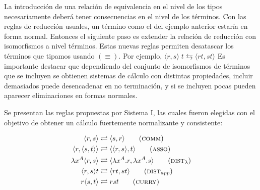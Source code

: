\documentclass[]{report}
\begin{document}
	La introducción de una relación de equivalencia en el nivel de los tipos necesariamente deberá tener consecuencias en el nivel de los términos.
	Con las reglas de reducción usuales, un término como el del ejemplo anterior estaría en forma normal.
	Entonces el siguiente paso es extender la relación de reducción con	isomorfismos a nivel términos.
	Estas nuevas reglas permiten desatascar los términos que tipamos usando $(\equiv)$.
	Por ejemplo, $\langle r, s \rangle \; t \leftrightarrows \langle r t, s t \rangle$
	Es importante destacar que dependiendo del conjunto de isomorfismos de términos que se incluyen se obtienen sistemas de cálculo con distintas propiedades, incluir demasiados puede desencadenar en no terminación, y si se incluyen pocas pueden aparecer eliminaciones en formas normales.
	
	Se presentan las reglas propuestas por Sistema I, las cuales fueron elegidas con el objetivo de obtener un cálculo fuertemente normalizante y consistente:
	
	\begin{align}
		\langle r,s \rangle &\rightleftarrows \langle s,r \rangle \tag{\textsc{comm}} \\
		\langle r, \langle s,t \rangle \rangle &\rightleftarrows \langle \langle r, s \rangle, t \rangle \tag{\textsc{asso}} \\
		\lambda x^A \langle r,s \rangle &\rightleftarrows \langle \lambda x^A.r, \lambda x^A.s \rangle \tag{$\textsc{dist}_{\lambda}$} \\
		\langle r,s \rangle t &\rightleftarrows \langle r t, s t \rangle \tag{$\textsc{dist}_{app}$} \\
		r \langle s, t \rangle &\rightleftarrows r s t \tag{\textsc{curry}}
	\end{align}
	
\end{document}
